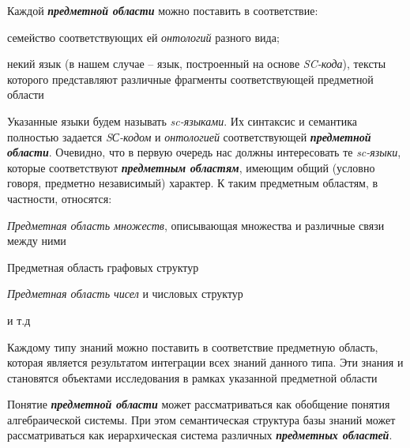 \begin{SCn}
{Каждой \textbf{\textit{предметной области}} можно поставить в соответствие:
\begin{scnenumerate}
    \item семейство соответствующих ей \textit{онтологий} разного вида;
    \item некий язык (в нашем случае – язык, построенный на основе \textit{SC-кода}), тексты которого представляют различные фрагменты соответствующей предметной области
\end{scnenumerate}


Указанные языки будем называть \textit{sc-языками}. Их синтаксис и семантика полностью задается \textit{SС-кодом} и \textit{онтологией} соответствующей \textbf{\textit{предметной области}}. Очевидно, что в первую очередь нас должны интересовать те \textit{sc-языки}, которые соответствуют \textbf{\textit{предметным областям}}, имеющим общий (условно говоря, предметно независимый) характер. К таким предметным областям, в частности, относятся:
\begin{scnitemize}
    \item \textit{Предметная область множеств}, описывающая множества и различные связи между ними
    \item Предметная область графовых структур
    \item \textit{Предметная область чисел} и числовых структур
    \item и т.д
\end{scnitemize}


Каждому типу знаний можно поставить в соответствие предметную область, которая является результатом интеграции всех знаний данного типа. Эти знания и становятся объектами исследования в рамках указанной предметной области


Понятие \textbf{\textit{предметной области}} может рассматриваться как обобщение понятия алгебраической системы. При этом семантическая структура базы знаний может рассматриваться как иерархическая система различных \textbf{\textit{предметных областей}}.
}

\end{SCn}
